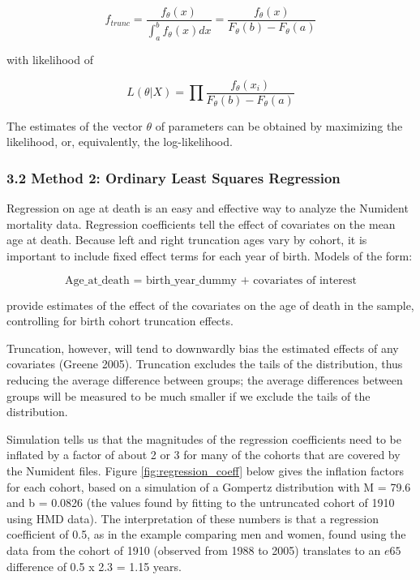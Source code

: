 \documentclass[
  11pt,
]{article}
\begin{document}
\begin{equation}
f_{trunc} = \frac{f_{\theta}(x)}{\int_a^b f_\theta (x)dx} = \frac{f_{\theta}(x)}{F_\theta (b) -F_\theta (a)  }
\end{equation}

with likelihood of

\begin{equation}
L(\theta | X) = \prod \frac{f_{\theta }(x_i) }{F_\theta (b) - F_{\theta} (a)}
\end{equation}

The estimates of the vector \(\theta\) of parameters can be obtained by
maximizing the likelihood, or, equivalently, the log-likelihood.

\hypertarget{method-2-ordinary-least-squares-regression}{%
\subsubsection{3.2 Method 2: Ordinary Least Squares
Regression}\label{method-2-ordinary-least-squares-regression}}

Regression on age at death is an easy and effective way to analyze the
Numident mortality data. Regression coefficients tell the effect of
covariates on the mean age at death. Because left and right truncation
ages vary by cohort, it is important to include fixed effect terms for
each year of birth. Models of the form:

\begin{equation}
  \text{Age\_at\_death = birth\_year\_dummy + covariates of interest}
\end{equation}

provide estimates of the effect of the covariates on the age of death in
the sample, controlling for birth cohort truncation effects.

Truncation, however, will tend to downwardly bias the estimated effects
of any covariates (Greene 2005). Truncation excludes the tails of the
distribution, thus reducing the average difference between groups; the
average differences between groups will be measured to be much smaller
if we exclude the tails of the distribution.

Simulation tells us that the magnitudes of the regression coefficients
need to be inflated by a factor of about 2 or 3 for many of the cohorts
that are covered by the Numident files. Figure
\ref{fig:regression_coeff} below gives the inflation factors for each
cohort, based on a simulation of a Gompertz distribution with M = 79.6
and b = 0.0826 (the values found by fitting to the untruncated cohort of
1910 using HMD data). The interpretation of these numbers is that a
regression coefficient of 0.5, as in the example comparing men and
women, found using the data from the cohort of 1910 (observed from 1988
to 2005) translates to an \(e65\) difference of 0.5 x 2.3 = 1.15 years.
\end{document}

